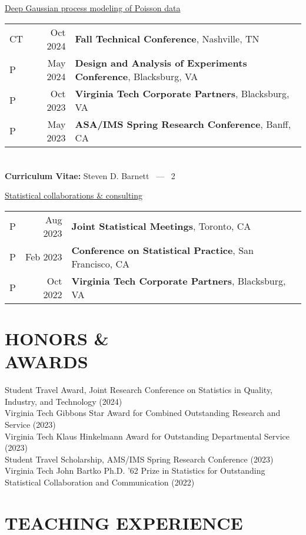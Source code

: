 \documentclass[margin,line]{res}
\begin{document}
\begin{resume}
\underline{Deep Gaussian process modeling of Poisson data}\\
\begin{tabular}{lrl}
CT\quad\quad & Oct 2024 & {\bf Fall Technical Conference}, Nashville, TN \\
P\quad\quad & May 2024 & {\bf Design and Analysis of Experiments Conference}, Blacksburg, VA \\
P\quad\quad & Oct 2023 & {\bf Virginia Tech Corporate Partners}, Blacksburg, VA \\
P\quad\quad & May 2023 & {\bf ASA/IMS Spring Research Conference}, Banff, CA \\
\end{tabular}

\pagebreak
\section{}
\hfill {\bf Curriculum Vitae:} Steven D. Barnett \  --- \  2

\underline{Statistical collaborations \& consulting}\\
\begin{tabular}{lrl}
P\quad\quad & Aug 2023 & {\bf Joint Statistical Meetings}, Toronto, CA \\
P\quad\quad & Feb 2023 & {\bf Conference on Statistical Practice}, San Francisco, CA \\
P\quad\quad & Oct 2022 & {\bf Virginia Tech Corporate Partners}, Blacksburg, VA \\
\end{tabular}

\section{\bf HONORS \& \\ AWARDS}
Student Travel Award, Joint Research Conference on Statistics in Quality, Industry, and Technology (2024) \\
Virginia Tech Gibbons Star Award for Combined Outstanding Research and Service (2023) \\
Virginia Tech Klaus Hinkelmann Award for Outstanding Departmental Service (2023) \\
Student Travel Scholarship, AMS/IMS Spring Research Conference (2023) \\
Virginia Tech John Bartko Ph.D. ’62 Prize in Statistics for Outstanding Statistical Collaboration and Communication (2022)

\section{TEACHING EXPERIENCE}


\end{resume}
\end{document}
